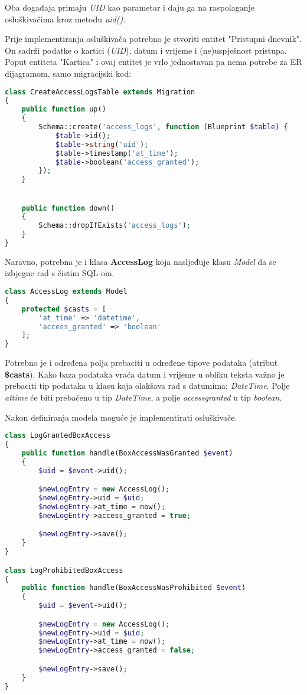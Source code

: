 Oba događaja primaju \textit{UID} kao parametar i daju ga na raspolaganje osluškivačima kroz metodu \textit{uid()}.

Prije implementiranja osluškivača potrebno je stvoriti entitet "Pristupni dnevnik".
On sadrži podatke o kartici (\textit{UID}), datum i vrijeme i (ne)uspješnost pristupa.
Poput entiteta "Kartica" i ovaj entitet je vrlo jednostavan pa nema potrebe za ER dijagramom, samo migracijski kod:

\begin{lstlisting}[language=PHP]
class CreateAccessLogsTable extends Migration
{
    public function up()
    {
        Schema::create('access_logs', function (Blueprint $table) {
            $table->id();
            $table->string('uid');
            $table->timestamp('at_time');
            $table->boolean('access_granted');
        });
    }


    public function down()
    {
        Schema::dropIfExists('access_logs');
    }
}
\end{lstlisting}

Naravno, potrebna je i klasa \textbf{AccessLog} koja nasljeđuje klasu \textit{Model} da se izbjegne rad s čistim SQL-om.

\begin{lstlisting}[language=PHP]
class AccessLog extends Model
{
    protected $casts = [
        'at_time' => 'datetime',
        'access_granted' => 'boolean'
    ];
}
\end{lstlisting}

Potrebno je i određena polja prebaciti u određene tipove podataka (atribut \textbf{\$casts}).
Kako baza podataka vraća datum i vrijeme u obliku teksta važno je prebaciti tip podataka u klasu koja olakšava rad s datumima:
\textit{DateTime}.
Polje \textit{at\textunderscore time} će biti prebačeno u tip \textit{DateTime}, a polje \textit{access\textunderscore granted} u tip \textit{boolean}.


Nakon definiranja modela moguće je implementirati osluškivače.

\begin{lstlisting}[language=PHP]
class LogGrantedBoxAccess
{
    public function handle(BoxAccessWasGranted $event)
    {
        $uid = $event->uid();

        $newLogEntry = new AccessLog();
        $newLogEntry->uid = $uid;
        $newLogEntry->at_time = now();
        $newLogEntry->access_granted = true;

        $newLogEntry->save();
    }
}

class LogProhibitedBoxAccess
{
    public function handle(BoxAccessWasProhibited $event)
    {
        $uid = $event->uid();

        $newLogEntry = new AccessLog();
        $newLogEntry->uid = $uid;
        $newLogEntry->at_time = now();
        $newLogEntry->access_granted = false;

        $newLogEntry->save();
    }
}
\end{lstlisting}

